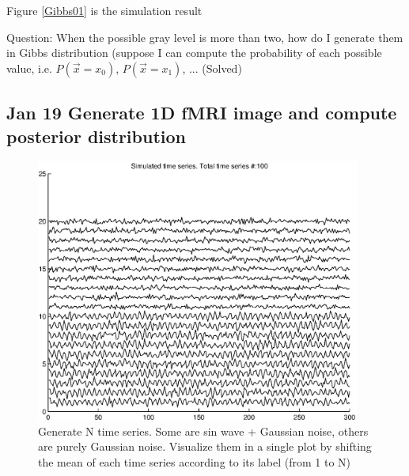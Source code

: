 \documentclass[12pt]{article}
\begin{document}
Figure \ref{Gibbs01} is the simulation result


Question: When the possible gray level is more than two, how do I generate them in Gibbs distribution (suppose I can compute the probability of each possible value, i.e. $P(\vec x = x_0)$, $P(\vec x = x_1)$, ... (Solved)
\subsection{Jan 19 Generate 1D fMRI image and compute posterior distribution}
\begin{figure}
\centering
\includegraphics[width = 0.95\textwidth]{1DTimeSeries.eps} 
\caption{Generate N time series. Some are sin wave + Gaussian noise, others are purely Gaussian noise. Visualize them in a single plot by shifting the mean of each time series according to its label (from 1 to N)}
\label{1D}
\end{figure}
\end{document}
